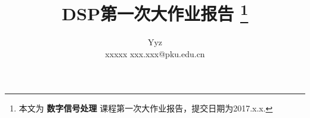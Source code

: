 \documentclass[a4paper,11pt,onecolumn,twoside]{article}
\title{\huge{DSP第一次大作业报告}
\thanks{本文为 \textbf{数字信号处理} 课程第一次大作业报告，提交日期为2017.x.x.}}
\author{Yyz \\[2pt]
\normalsize
xxxxx \qquad xxx.xxx@pku.edu.cn
\\[2pt]}
\date{}  %
\begin{document}
\newcommand{\supercite}[1]{\textsuperscript{\cite{#1}}}

\maketitle

\setlength{\oddsidemargin}{-.5cm}  %
\setlength{\evensidemargin}{\oddsidemargin}
\setlength{\textwidth}{17.00cm}
\end{document}
